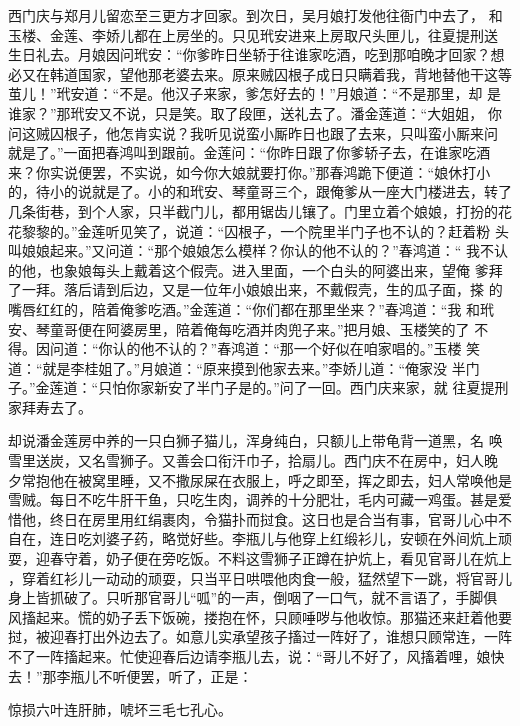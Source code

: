 西门庆与郑月儿留恋至三更方才回家。到次日，吴月娘打发他往衙门中去了，
和玉楼、金莲、李娇儿都在上房坐的。只见玳安进来上房取尺头匣儿，往夏提刑送
生日礼去。月娘因问玳安：“你爹昨日坐轿于往谁家吃酒，吃到那咱晚才回家？想
必又在韩道国家，望他那老婆去来。原来贼囚根子成日只瞒着我，背地替他干这等
茧儿！”玳安道：“不是。他汉子来家，爹怎好去的！”月娘道：“不是那里，却
是谁家？”那玳安又不说，只是笑。取了段匣，送礼去了。潘金莲道：“大姐姐，
你问这贼囚根子，他怎肯实说？我听见说蛮小厮昨日也跟了去来，只叫蛮小厮来问
就是了。”一面把春鸿叫到跟前。金莲问：“你昨日跟了你爹轿子去，在谁家吃酒
来？你实说便罢，不实说，如今你大娘就要打你。”那春鸿跪下便道：“娘休打小
的，待小的说就是了。小的和玳安、琴童哥三个，跟俺爹从一座大门楼进去，转了
几条街巷，到个人家，只半截门儿，都用锯齿儿镶了。门里立着个娘娘，打扮的花
花黎黎的。”金莲听见笑了，说道：“囚根子，一个院里半门子也不认的？赶着粉
头叫娘娘起来。”又问道：“那个娘娘怎么模样？你认的他不认的？”春鸿道：“
我不认的他，也象娘每头上戴着这个假壳。进入里面，一个白头的阿婆出来，望俺
爹拜了一拜。落后请到后边，又是一位年小娘娘出来，不戴假壳，生的瓜子面，搽
的嘴唇红红的，陪着俺爹吃酒。”金莲道：“你们都在那里坐来？”春鸿道：“我
和玳安、琴童哥便在阿婆房里，陪着俺每吃酒并肉兜子来。”把月娘、玉楼笑的了
不得。因问道：“你认的他不认的？”春鸿道：“那一个好似在咱家唱的。”玉楼
笑道：“就是李桂姐了。”月娘道：“原来摸到他家去来。”李娇儿道：“俺家没
半门子。”金莲道：“只怕你家新安了半门子是的。”问了一回。西门庆来家，就
往夏提刑家拜寿去了。

却说潘金莲房中养的一只白狮子猫儿，浑身纯白，只额儿上带龟背一道黑，名
唤雪里送炭，又名雪狮子。又善会口衔汗巾子，拾扇儿。西门庆不在房中，妇人晚
夕常抱他在被窝里睡，又不撒尿屎在衣服上，呼之即至，挥之即去，妇人常唤他是
雪贼。每日不吃牛肝干鱼，只吃生肉，调养的十分肥壮，毛内可藏一鸡蛋。甚是爱
惜他，终日在房里用红绢裹肉，令猫扑而挝食。这日也是合当有事，官哥儿心中不
自在，连日吃刘婆子药，略觉好些。李瓶儿与他穿上红缎衫儿，安顿在外间炕上顽
耍，迎春守着，奶子便在旁吃饭。不料这雪狮子正蹲在护炕上，看见官哥儿在炕上
，穿着红衫儿一动动的顽耍，只当平日哄喂他肉食一般，猛然望下一跳，将官哥儿
身上皆抓破了。只听那官哥儿“呱”的一声，倒咽了一口气，就不言语了，手脚俱
风搐起来。慌的奶子丢下饭碗，搂抱在怀，只顾唾哕与他收惊。那猫还来赶着他要
挝，被迎春打出外边去了。如意儿实承望孩子搐过一阵好了，谁想只顾常连，一阵
不了一阵搐起来。忙使迎春后边请李瓶儿去，说：“哥儿不好了，风搐着哩，娘快
去！”那李瓶儿不听便罢，听了，正是：

惊损六叶连肝肺，唬坏三毛七孔心。

